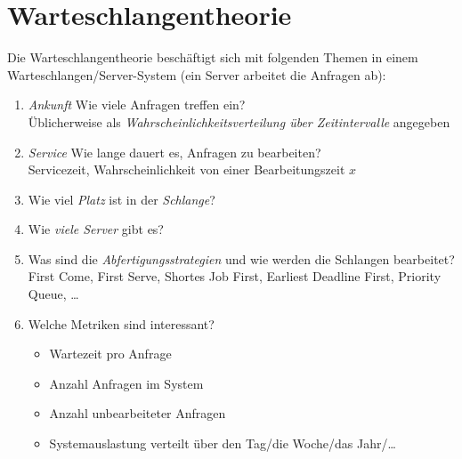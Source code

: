 \chapter{Warteschlangentheorie}
	Die Warteschlangentheorie beschäftigt sich mit folgenden Themen in einem Warteschlangen/Server-System (ein Server arbeitet die Anfragen ab):
	\begin{enumerate}
		\item \textit{Ankunft} Wie viele Anfragen treffen ein? \\ Üblicherweise als \textit{Wahrscheinlichkeitsverteilung über Zeitintervalle} angegeben
		\item \textit{Service} Wie lange dauert es, Anfragen zu bearbeiten? \\ Servicezeit, Wahrscheinlichkeit von einer Bearbeitungszeit $ x $
		\item Wie viel \textit{Platz} ist in der \textit{Schlange}?
		\item Wie \textit{viele Server} gibt es?
		\item Was sind die \textit{Abfertigungsstrategien} und wie werden die Schlangen bearbeitet? \\ First Come, First Serve, Shortes Job First, Earliest Deadline First, Priority Queue, \dots
		\item Welche Metriken sind interessant?
			\begin{itemize}
				\item Wartezeit pro Anfrage
				\item Anzahl Anfragen im System
				\item Anzahl unbearbeiteter Anfragen
				\item Systemauslastung verteilt über den Tag/die Woche/das Jahr/\dots
			\end{itemize}
	\end{enumerate}

